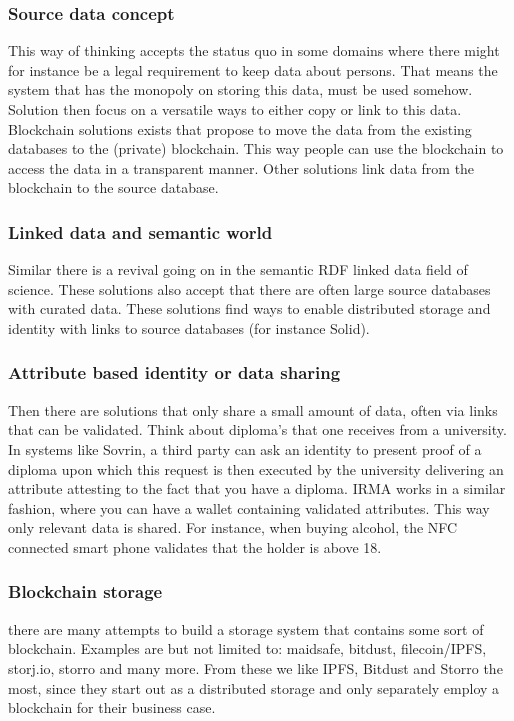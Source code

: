 \documentclass{article}
\begin{document}
\subsubsection{Source data concept}
This way of thinking accepts the status quo in some domains where there might for instance be a legal requirement to keep data about persons. That means the system that has the monopoly on storing this data, must be used somehow. Solution then focus on a versatile ways to either copy or link to this data. Blockchain solutions exists that propose to move the data from the existing databases to the (private) blockchain. This way people can use the blockchain to access the data in a transparent manner. Other solutions link data from the blockchain to the source database.

\subsubsection{Linked data and semantic world}
Similar there is a revival going on in the semantic RDF linked data field of science. These solutions also accept that there are often large source databases with curated data. These solutions find ways to enable distributed storage and identity with links to source databases (for instance Solid).

\subsubsection{Attribute based identity or data sharing}
Then there are solutions that only share a small amount of data, often via links that can be validated. Think about diploma's that one receives from a university. In systems like Sovrin, a third party can ask an identity to present proof of a diploma upon which this request is then executed by the university delivering an attribute attesting to the fact that you have a diploma. IRMA works in a similar fashion, where you can have a wallet containing validated attributes. This way only relevant data is shared. For instance, when buying alcohol, the NFC connected smart phone validates that the holder is above 18.

\subsubsection{Blockchain storage}
there are many attempts to build a storage system that contains some sort of blockchain. Examples are but not limited to: maidsafe, bitdust, filecoin/IPFS, storj.io, storro and many more. From these we like IPFS, Bitdust and Storro the most, since they start out as a distributed storage and only separately employ a blockchain for their business case.
\end{document}
